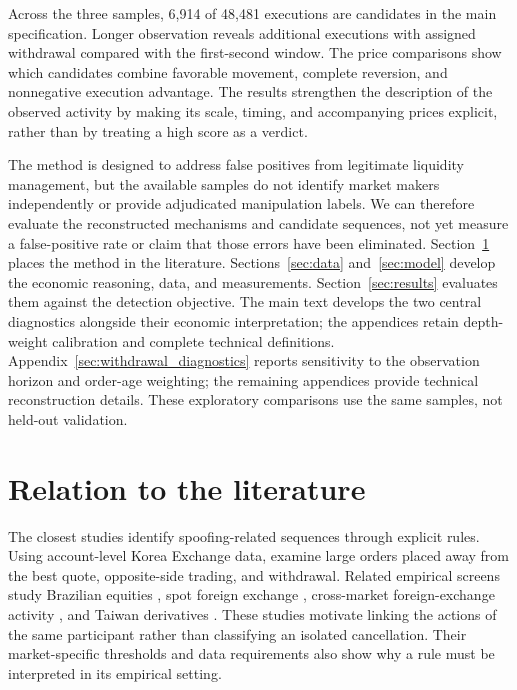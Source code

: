 \documentclass[11pt]{article}
\newenvironment{review}{\begingroup\color{blue}}{\endgroup}
\begin{document}
Across the three samples, 6,914 of 48,481 executions are candidates in the main specification. Longer observation reveals additional executions with assigned withdrawal compared with the first-second window. The price comparisons show which candidates combine favorable movement, complete reversion, and nonnegative execution advantage. The results strengthen the description of the observed activity by making its scale, timing, and accompanying prices explicit, rather than by treating a high score as a verdict.

The method is designed to address false positives from legitimate liquidity management, but the available samples do not identify market makers independently or provide adjudicated manipulation labels. We can therefore evaluate the reconstructed mechanisms and candidate sequences, not yet measure a false-positive rate or claim that those errors have been eliminated. Section~\ref{sec:existing_approaches} places the method in the literature. Sections~\ref{sec:data} and~\ref{sec:model} develop the economic reasoning, data, and measurements. Section~\ref{sec:results} evaluates them against the detection objective. \begin{review}The main text develops the two central diagnostics alongside their economic interpretation; the appendices retain depth-weight calibration and complete technical definitions. Appendix~\ref{sec:withdrawal_diagnostics} reports sensitivity to the observation horizon and order-age weighting; the remaining appendices provide technical reconstruction details. These exploratory comparisons use the same samples, not held-out validation.\end{review}

\section{Relation to the literature}
\label{sec:existing_approaches}
The closest studies identify spoofing-related sequences through explicit rules. Using account-level Korea Exchange data, \cite{LeeEomPark2013} examine large orders placed away from the best quote, opposite-side trading, and withdrawal. Related empirical screens study Brazilian equities \cite{MendoncaDeGenaro2020}, spot foreign exchange \cite{StenforsSusai2021}, cross-market foreign-exchange activity \cite{StenforsEtAl2023}, and Taiwan derivatives \cite{ChenHsiehYang2026}. These studies motivate linking the actions of the same participant rather than classifying an isolated cancellation. Their market-specific thresholds and data requirements also show why a rule must be interpreted in its empirical setting.
\end{document}
